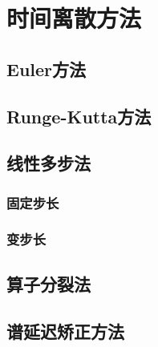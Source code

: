 \section{时间离散方法}

\subsection{Euler方法}

\subsection{Runge-Kutta方法}

\subsection{线性多步法}
\subsubsection{固定步长}
\subsubsection{变步长}


\subsection{算子分裂法}

\subsection{谱延迟矫正方法}



